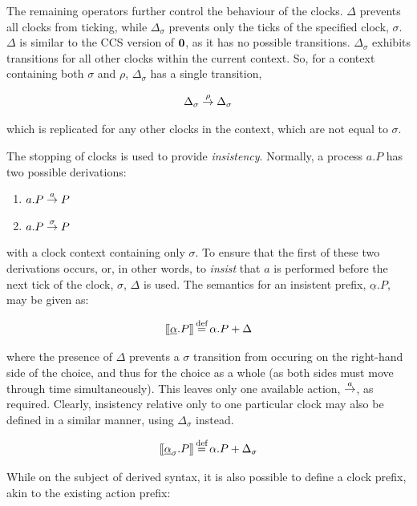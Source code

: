 The remaining operators further control the behaviour of the clocks.
$\Delta$ prevents all clocks from ticking, while $\Delta_{\sigma}$
prevents only the ticks of the specified clock, $\sigma$.  $\Delta$ is
similar to the CCS version of $\textbf{0}$, as it has no possible
transitions.  $\Delta_{\sigma}$ exhibits transitions for all other
clocks within the current context.  So, for a context containing both
$\sigma$ and $\rho$, $\Delta_{\sigma}$ has a single transition,

\begin{equation}
  \Delta_{\sigma} \stackrel{\rho}{\rightarrow} \Delta_{\sigma}
\end{equation}

\noindent which is replicated for any other clocks in the context,
which are not equal to $\sigma$.

The stopping of clocks is used to provide \emph{insistency}.  Normally,
a process $a.P$ has two possible derivations:

\begin{enumerate}
  \item $a.P \stackrel{a}{\rightarrow} P$
  \item $a.P \stackrel{\sigma}{\rightarrow} P$
\end{enumerate}

\noindent with a clock context containing only $\sigma$.  To ensure
that the first of these two derivations occurs, or, in other words, to
\emph{insist} that $a$ is performed before the next tick of the clock,
$\sigma$, $\Delta$ is used.  The semantics for an insistent prefix,
$\underline{\alpha}.P$, may be given as:

\begin{equation}
[\hspace{-0.3ex}[ \underline{\alpha}.P ]\hspace{-0.3ex}] \operatorname{\stackrel{\textrm{def}}{=}} \alpha.P + \Delta 
\end{equation}

\noindent where the presence of $\Delta$ prevents a $\sigma$
transition from occuring on the right-hand side of the choice, and
thus for the choice as a whole (as both sides must move through time
simultaneously).  This leaves only one available action,
$\stackrel{a}{\rightarrow}$, as required.  Clearly, insistency relative only to one
particular clock may also be defined in a similar manner, using
$\Delta_{\sigma}$ instead.

\begin{equation}
[\hspace{-0.3ex}[ \underline{\alpha}_{\sigma}.P ]\hspace{-0.3ex}] \operatorname{\stackrel{\textrm{def}}{=}} \alpha.P + \Delta_{\sigma} 
\end{equation}

While on the subject of derived syntax, it is also possible to define
a clock prefix, akin to the existing action prefix:

